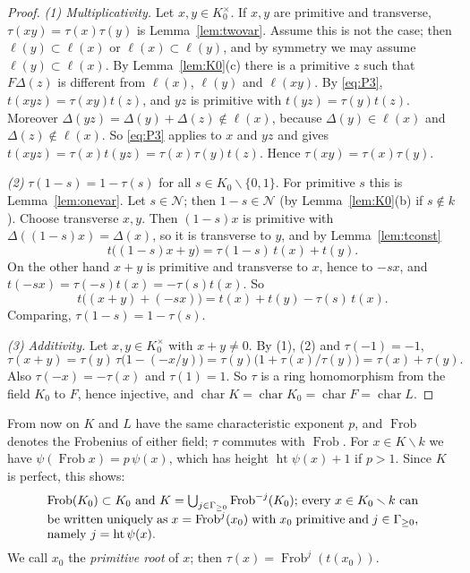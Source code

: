 \documentclass[11pt]{amsart}
\theoremstyle{definition}
\theoremstyle{remark}
\newcommand{\Frob}{\operatorname{Frob}}
\newcommand{\hgt}{\operatorname{ht}}
\newcommand{\chr}{\operatorname{char}}
\newcommand{\sm}{\smallsetminus}
\begin{document}
\begin{proof}
\emph{(1) Multiplicativity.} Let $x,y\in K_0^\times$. If $x,y$ are primitive and transverse, $\tau(xy)=\tau(x)\tau(y)$ is Lemma~\ref{lem:twovar}. Assume this is not the case; then $\ell(y)\subset\ell(x)$ or $\ell(x)\subset\ell(y)$, and by symmetry we may assume $\ell(y)\subset\ell(x)$.
By Lemma~\ref{lem:K0}(c) there is a primitive $z$ such that $F\Delta(z)$ is different from $\ell(x)$, $\ell(y)$ and $\ell(xy)$.
By \eqref{eq:P3}, $t(xyz)=\tau(xy)t(z)$, and $yz$ is primitive with $t(yz)=\tau(y)t(z)$. Moreover $\Delta(yz)=\Delta(y)+\Delta(z)\notin\ell(x)$, because $\Delta(y)\in\ell(x)$ and $\Delta(z)\notin\ell(x)$.
So \eqref{eq:P3} applies to $x$ and $yz$ and gives $t(xyz)=\tau(x)t(yz)=\tau(x)\tau(y)t(z)$. Hence $\tau(xy)=\tau(x)\tau(y)$.

\emph{(2)} $\tau(1-s)=1-\tau(s)$ for all $s\in K_0\sm\{0,1\}$. For primitive $s$ this is Lemma~\ref{lem:onevar}. Let $s\in\mathcal N$; then $1-s\in\mathcal N$ (by Lemma~\ref{lem:K0}(b) if $s\notin k$).
Choose transverse $x,y$. Then $(1-s)x$ is primitive with $\Delta((1-s)x)=\Delta(x)$, so it is transverse to $y$, and by Lemma~\ref{lem:tconst}
\[ t\bigl((1-s)x+y\bigr)=\tau(1-s)\,t(x)+t(y). \]
On the other hand $x+y$ is primitive and transverse to $x$, hence to $-sx$, and $t(-sx)=\tau(-s)t(x)=-\tau(s)t(x)$. So
\[ t\bigl((x+y)+(-sx)\bigr)=t(x)+t(y)-\tau(s)\,t(x). \]
Comparing, $\tau(1-s)=1-\tau(s)$.

\emph{(3) Additivity.} Let $x,y\in K_0^\times$ with $x+y\neq0$. By (1), (2) and $\tau(-1)=-1$,
\[ \tau(x+y)=\tau(y)\,\tau\bigl(1-(-x/y)\bigr)=\tau(y)\bigl(1+\tau(x)/\tau(y)\bigr)=\tau(x)+\tau(y). \]
Also $\tau(-x)=-\tau(x)$ and $\tau(1)=1$. So $\tau$ is a ring homomorphism from the field $K_0$ to $F$, hence injective, and $\chr K=\chr K_0=\chr F=\chr L$.
\end{proof}

From now on $K$ and $L$ have the same characteristic exponent $p$, and $\Frob$ denotes the Frobenius of either field; $\tau$ commutes with $\Frob$.
For $x\in K\sm k$ we have $\psi(\Frob x)=p\,\psi(x)$, which has height $\hgt\psi(x)+1$ if $p>1$. Since $K$ is perfect, this shows:
\begin{equation}\label{eq:roots}
\begin{minipage}{0.86\textwidth}
$\Frob(K_0)\subset K_0$ and $K=\bigcup_{j\in\Gamma_{\ge0}}\Frob^{-j}(K_0)$; every $x\in K_0\sm k$ can be written uniquely as $x=\Frob^j(x_0)$ with $x_0$ primitive and $j\in\Gamma_{\ge0}$, namely $j=\hgt\psi(x)$.
\end{minipage}
\end{equation}
We call $x_0$ the \emph{primitive root} of $x$; then $\tau(x)=\Frob^j(t(x_0))$.
\end{document}
